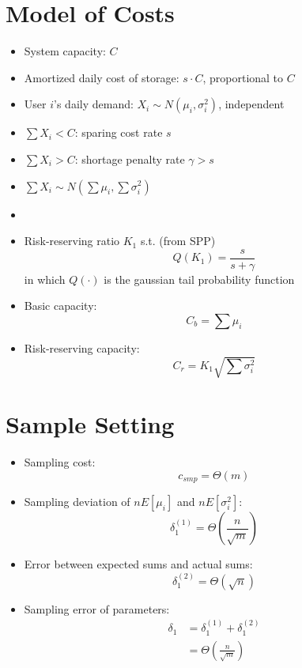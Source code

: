 \documentclass[a0,portrait]{a0poster}
\begin{document}
\begin{multicols}{2}
\begin{itemize}
\end{itemize}

\section*{Model of Costs}
\begin{itemize}
\item System capacity: $C$
\item Amortized daily cost of storage: $s\cdot C$, proportional to $C$
\item User $i$'s daily demand: $X_i\sim N(\mu_i,\sigma_i^2)$, independent
\item $\sum X_i<C$: sparing cost rate $s$
\item $\sum X_i>C$: shortage penalty rate $\gamma>s$
\item $\sum X_i\sim N(\sum\mu_i, \sum\sigma_i^2)$
\item {} \\
\item Risk-reserving ratio $K_1$ s.t. (from SPP) \\
$$     Q(K_1)=\frac{s}{s+\gamma} $$
in which $Q(\cdot)$ is the gaussian tail probability function
\item Basic capacity:
 $$ C_b = \sum\mu_i $$
\item Risk-reserving capacity:
 $$ C_r = K_1\sqrt{\sum\sigma_i^2} $$
\end{itemize}

\section* {Sample Setting}
\begin{itemize}
\item Sampling cost:
 $$c_{smp}=\Theta(m)$$
\item Sampling deviation of $nE[\mu_i]$ and $nE[\sigma_i^2]$:
 $$\delta_1^{(1)}=\Theta\left(\frac{n}{\sqrt{m}}\right)$$
\item Error between expected sums and actual sums:
 $$\delta_1^{(2)}=\Theta(\sqrt{n})$$
\item Sampling error of parameters:
 \begin{align*}
	\delta_1 &= \delta_1^{(1)} + \delta_1^{(2)} \\
            &= \Theta\left(\frac{n}{\sqrt{m}}\right)
 \end{align*}


\end{itemize}
\end{multicols}
\end{document}
